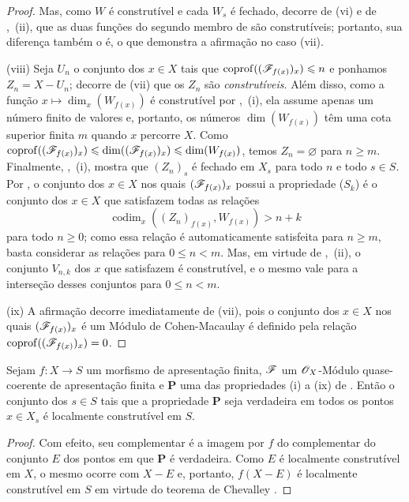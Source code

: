 \begin{proof}
Mas, como $W$ é construtível  e cada $W_s$ é fechado, decorre de (vi) e de ,~(ii), que as duas funções do segundo membro de  são construtíveis; portanto, sua diferença também o é, o que demonstra a afirmação no caso (vii).

(viii) Seja $U_n$ o conjunto dos $x\in X$ tais que $\operatorname{coprof}((\mathscr{F}_{f(x)})_x)\leqslant n$ e ponhamos $Z_n=X-U_n$; decorre de (vii) que os $Z_n$ são \emph{construtíveis}.
Além disso, como a função $x\mapsto\dim_x(W_{f(x)})$ é construtível por ,~(i), ela assume apenas um número finito de valores e, portanto, os números $\dim(W_{f(x)})$ têm uma cota superior finita $m$ quando $x$ percorre $X$.
Como $\operatorname{coprof}((\mathscr{F}_{f(x)})_x)\leqslant\dim((\mathscr{F}_{f(x)})_x)\leqslant\dim(W_{f(x)})$, temos $Z_n=\varnothing$ para $n\geqslant m$.
Finalmente, ,~(i), mostra que $(Z_n)_s$ é fechado em $X_s$ para todo $n$ e todo $s\in S$.
Por , o conjunto dos $x\in X$ nos quais $(\mathscr{F}_{f(x)})_x$ possui a propriedade ($S_k$) é o conjunto dos $x\in X$ que satisfazem todas as relações
\begin{equation}
\tag{9.9.2.2}
\label{IV.9.9.2.2}
  \operatorname{codim}_x((Z_n)_{f(x)},W_{f(x)})>n+k
\end{equation}
para todo $n\geqslant 0$; como essa relação é automaticamente satisfeita para $n\geqslant m$, basta considerar as relações  para $0\leqslant n<m$.
Mas, em virtude de ,~(ii), o conjunto $V_{n,k}$ dos $x$ que satisfazem  é construtível, e o mesmo vale para a interseção desses conjuntos para $0\leqslant n<m$.

(ix) A afirmação decorre imediatamente de (vii), pois o conjunto dos $x\in X$ nos quais $(\mathscr{F}_{f(x)})_x$ é um Módulo de Cohen-Macaulay é definido pela relação $\operatorname{coprof}((\mathscr{F}_{f(x)})_x)=0$.
\end{proof}

\begin{corollary}[9.9.3]
\label{IV.9.9.3}
Sejam $f:X\to S$ um morfismo de apresentação finita, $\mathscr{F}$ um $\mathscr{O}_X$-Módulo quase-coerente de apresentação finita e $\mathbf{P}$ uma das propriedades (i) a (ix) de .
Então o conjunto dos $s\in S$ tais que a propriedade $\mathbf{P}$ seja verdadeira em todos os pontos $x\in X_s$ é localmente construtível em $S$.
\end{corollary}

\begin{proof}
\label{IV.9.9.3-proof}
Com efeito, seu complementar é a imagem por $f$ do complementar do conjunto $E$ dos pontos em que $\mathbf{P}$ é verdadeira.
Como $E$ é localmente construtível em $X$, o mesmo ocorre com $X-E$ e, portanto, $f(X-E)$ é localmente construtível em $S$ em virtude do teorema de Chevalley .
\end{proof}

